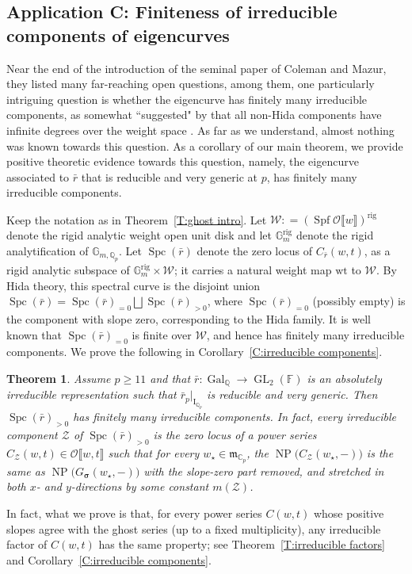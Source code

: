 \documentclass[12pt]{amsart}
\newtheorem{theorem}[subsection]{Theorem}
\theoremstyle{definition}
\numberwithin{equation}{subsection}
\def\calO{\mathcal{O}}
\def\calW{\mathcal{W}}
\def\calZ{\mathcal{Z}}
\def\gothm{\mathfrak{m}}
\def\CC{\mathbb{C}}
\def\FF{\mathbb{F}}
\def\GG{\mathbb{G}}
\def\QQ{\mathbb{Q}}
\def\rmI{\mathrm{I}}
\DeclareMathOperator{\Gal}{Gal}
\DeclareMathOperator{\GL}{GL}
\DeclareMathOperator{\NP}{NP}
\DeclareMathOperator{\Spf}{Spf}
\newcommand{\bbsigma}{\boldsymbol{\sigma}}
\newcommand{\rig}{\mathrm{rig}}
\newcommand{\wt}{\mathrm{wt}}
\DeclareMathOperator{\Spc}{Spc}
\begin{document}
\subsection{Application C: Finiteness of irreducible components of eigencurves}
Near the end of the introduction of the seminal paper \cite{coleman-mazur} of Coleman and Mazur, they listed many far-reaching open questions, among them, one particularly intriguing question is whether the eigencurve has finitely many irreducible components, as somewhat ``suggested" by that all non-Hida components have infinite degrees over the weight space \cite{hattori-newton}.
As far as we understand, almost nothing was known towards this question.
As a corollary of our main theorem, we provide positive theoretic evidence towards this question, namely, the eigencurve associated to $\bar r$ that is reducible and very generic at $p$, has finitely many irreducible components.


Keep the notation as in Theorem~\ref{T:ghost intro}. Let $\calW: =(\Spf\calO\llbracket w\rrbracket)^\rig$ denote the rigid analytic weight open unit disk and let $\GG_m^\rig$ denote the rigid analytification of $\GG_{m, \QQ_p}$.  Let $\Spc(\bar r)$ denote the zero locus of $C_{\bar r}(w,t)$, as a rigid analytic subspace of $\GG_m^\rig \times \calW$; it carries a natural weight map $\wt$ to $\calW$.  By Hida theory, this spectral curve is the disjoint union $\Spc (\bar r)= \Spc(\bar r)_{=0} \bigsqcup \Spc(\bar r)_{>0}$, where $\Spc(\bar r)_{=0}$ (possibly empty) is the component with slope zero, corresponding to the Hida family. It is well known that $\Spc(\bar r)_{=0}$ is finite over $\calW$, and hence has finitely many irreducible components.
We prove the following in Corollary~\ref{C:irreducible components}.
\begin{theorem}
\label{T:irreducible components intro}
Assume $p \geq 11$ and that $\bar r: \Gal_{\QQ} \to \GL_2(\FF)$ is an absolutely irreducible representation such that $\bar r_p|_{\rmI_{\QQ_p}}$ is reducible and very generic.
Then $\Spc (\bar r)_{>0}$ has finitely many irreducible components. In fact, every irreducible component $\calZ$ of $\Spc (\bar r)_{>0}$ is the zero locus of a power series $C_\calZ(w,t) \in \calO\llbracket w,t\rrbracket$ such that for every $w_\star \in \gothm_{\CC_p}$, the $\NP\big( C_\calZ(w_\star, -)\big)$ is the same as $\NP\big(G_{\bbsigma}(w_\star,-)\big)$ with the slope-zero part removed, and stretched in both $x$- and $y$-directions by some constant $m(\calZ)$.
\end{theorem}
In fact, what we prove is that, for every power series $C(w,t)$ whose positive slopes agree with the ghost series (up to a fixed multiplicity), any irreducible factor of $C(w,t)$ has the same property; see Theorem~\ref{T:irreducible factors} and Corollary~\ref{C:irreducible components}.
\end{document}
